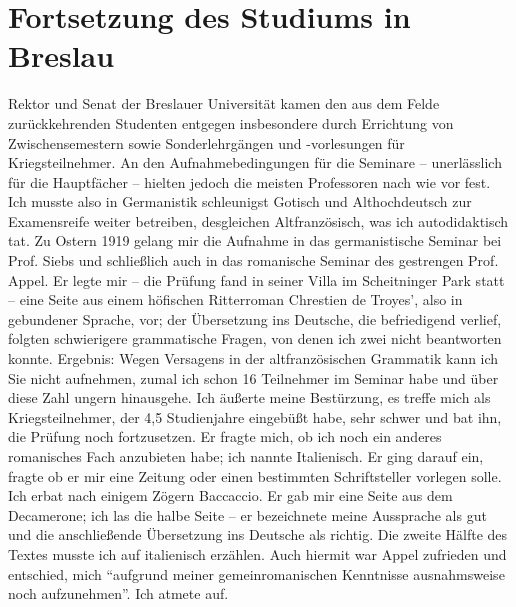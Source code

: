 \section{Fortsetzung des Studiums in Breslau}
Rektor und Senat der Breslauer Universität kamen den aus dem Felde zurückkehrenden Studenten entgegen insbesondere durch Errichtung von Zwischensemestern sowie Sonderlehrgängen und -vorlesungen für Kriegsteilnehmer. An den Aufnahmebedingungen für die Seminare -- unerlässlich für die Hauptfächer -- hielten jedoch die meisten Professoren nach wie vor fest. Ich musste also in Germanistik schleunigst Gotisch und Althochdeutsch zur Examensreife weiter betreiben, desgleichen Altfranzösisch, was ich autodidaktisch tat. Zu Ostern 1919 gelang mir die Aufnahme in das germanistische Seminar bei Prof. Siebs und schließlich auch in das romanische Seminar des gestrengen Prof. Appel. Er legte mir -- die Prüfung fand in seiner Villa im Scheitninger Park statt -- eine Seite aus einem höfischen Ritterroman Chrestien de Troyes', also in gebundener Sprache, vor; der Übersetzung ins Deutsche, die befriedigend verlief, folgten schwierigere grammatische Fragen, von denen ich zwei nicht beantworten konnte. Ergebnis: Wegen Versagens in der altfranzösischen Grammatik kann ich Sie nicht aufnehmen, zumal ich schon 16 Teilnehmer im Seminar habe und über diese Zahl ungern hinausgehe. Ich äußerte meine Bestürzung, es treffe mich als Kriegsteilnehmer, der 4,5 Studienjahre eingebüßt habe, sehr schwer und bat ihn, die Prüfung noch fortzusetzen. Er fragte mich, ob ich noch ein anderes romanisches Fach anzubieten habe; ich nannte Italienisch. Er ging darauf ein, fragte ob er mir eine Zeitung oder einen bestimmten Schriftsteller vorlegen solle. Ich erbat nach einigem Zögern Baccaccio. Er gab mir eine Seite aus dem Decamerone; ich las die halbe Seite -- er bezeichnete meine Aussprache als gut und die anschließende Übersetzung ins Deutsche als richtig. Die zweite Hälfte des Textes musste ich auf italienisch erzählen. Auch hiermit war Appel zufrieden und entschied, mich \enquote{aufgrund meiner gemeinromanischen Kenntnisse ausnahmsweise noch aufzunehmen}. Ich atmete auf.

